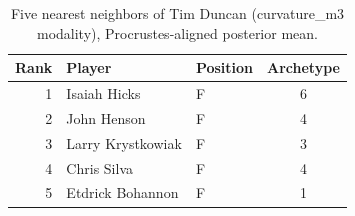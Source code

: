 \begin{table}[htbp]
  \centering\small
  \begin{tabular}{rllc}
    \toprule
    Rank & Player & Position & Archetype \\
    \midrule
    1 & Isaiah Hicks & F & 6 \\
    2 & John Henson & F & 4 \\
    3 & Larry Krystkowiak & F & 3 \\
    4 & Chris Silva & F & 4 \\
    5 & Etdrick Bohannon & F & 1 \\
    \bottomrule
  \end{tabular}
  \caption{Five nearest neighbors of Tim Duncan (curvature_m3 modality), Procrustes-aligned posterior mean.}
  \label{tab:Tim_Duncan_neighbors_curvature_m3}
\end{table}

